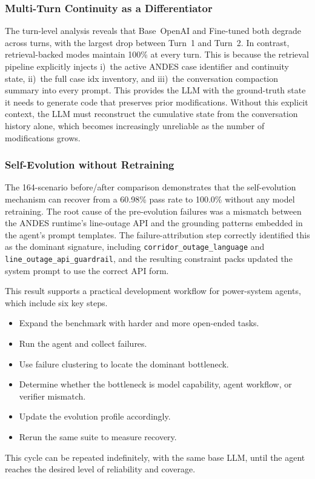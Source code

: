\documentclass[journal]{IEEEtran}
\begin{document}
\subsubsection{Multi-Turn Continuity as a Differentiator}

The turn-level analysis reveals that Base~OpenAI and Fine-tuned both degrade across turns, with the largest drop between Turn~1 and Turn~2.
In contrast, retrieval-backed modes maintain 100\% at every turn.
This is because the retrieval pipeline explicitly injects
i)~the active ANDES case identifier and continuity state,
ii)~the full case idx inventory, and
iii)~the conversation compaction summary
into every prompt. This provides the LLM with the ground-truth state it needs to generate code that preserves prior modifications.
Without this explicit context, the LLM must reconstruct the cumulative state from the conversation history alone, which becomes increasingly unreliable as the number of modifications grows.

\subsubsection{Self-Evolution without Retraining}

The 164-scenario before/after comparison demonstrates that the self-evolution mechanism can recover from a 60.98\% pass rate to 100.0\% without any model retraining.
The root cause of the pre-evolution failures was a mismatch between the ANDES runtime's line-outage API and the grounding patterns embedded in the agent's prompt templates.
The failure-attribution step correctly identified this as the dominant signature, including \texttt{corridor\_outage\_language} and \texttt{line\_outage\_api\_guardrail}, and the resulting constraint
packs updated the system prompt to use the correct API form.

This result supports a practical development workflow for power-system agents, which include six key steps.
\begin{itemize}
  \item Expand the benchmark with harder and more open-ended tasks.
  \item Run the agent and collect failures.
  \item Use failure clustering to locate the dominant bottleneck.
  \item Determine whether the bottleneck is model capability, agent workflow, or verifier mismatch.
  \item Update the evolution profile accordingly.
  \item Rerun the same suite to measure recovery.
\end{itemize}
This cycle can be repeated indefinitely, with the same base LLM, until the agent reaches the desired level of reliability and coverage.
\end{document}
